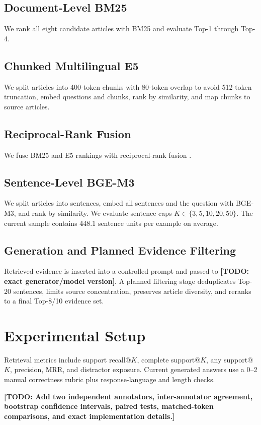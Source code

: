 \documentclass[11pt]{article}
\begin{document}
\subsection{Document-Level BM25}
We rank all eight candidate articles with BM25 and evaluate Top-1 through Top-4.

\subsection{Chunked Multilingual E5}
We split articles into 400-token chunks with 80-token overlap to avoid 512-token truncation, embed questions and chunks, rank by similarity, and map chunks to source articles.

\subsection{Reciprocal-Rank Fusion}
We fuse BM25 and E5 rankings with reciprocal-rank fusion \citep{cormack2009rrf}.

\subsection{Sentence-Level BGE-M3}
We split articles into sentences, embed all sentences and the question with BGE-M3, and rank by similarity. We evaluate sentence caps $K \in \{3,5,10,20,50\}$. The current sample contains 448.1 sentence units per example on average.

\subsection{Generation and Planned Evidence Filtering}
Retrieved evidence is inserted into a controlled prompt and passed to \textbf{[TODO: exact generator/model version]}. A planned filtering stage deduplicates Top-20 sentences, limits source concentration, preserves article diversity, and reranks to a final Top-8/10 evidence set.

\section{Experimental Setup}
Retrieval metrics include support recall@$K$, complete support@$K$, any support@$K$, precision, MRR, and distractor exposure. Current generated answers use a 0--2 manual correctness rubric plus response-language and length checks.

\textbf{[TODO: Add two independent annotators, inter-annotator agreement, bootstrap confidence intervals, paired tests, matched-token comparisons, and exact implementation details.]}
\end{document}
